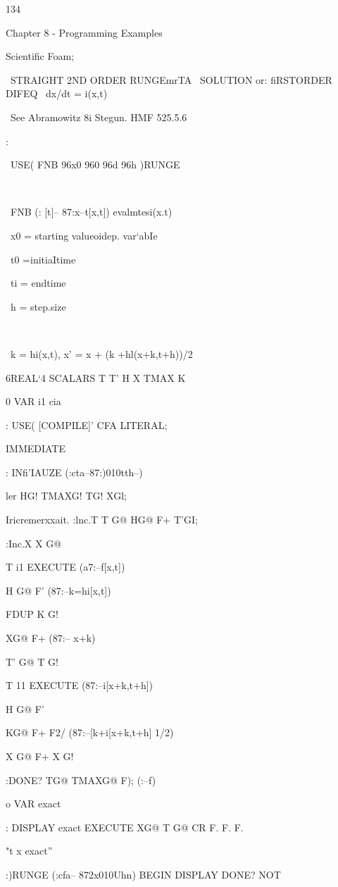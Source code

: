 {134

Chapter 8 - Programming Examples

Scientific Foam;

 

\ STRAIGHT 2ND ORDER RUNGEmrTA
\ SOLUTION or: fiRSTORDER DIFEQ
\ dx/dt = i(x,t)

\ See Abramowitz 8i Stegun. HMF 525.5.6

\Usege:

\ USE( FNB 96x0 960 96d 96h )RUNGE

\

\ FNB (: [t]-- 87:x--t[x,t]) evalmtesi(x.t)

\ x0 = starting valueoidep. var‘abIe

\ t0 =initiaItime

\ ti = endtime

\ h = step.size

\

\ k = hi(x,t), x' = x + (k +hl(x+k,t+h))/2

6REAL‘4 SCALARS T T' H X TMAX K

0 VAR i1 \tohoid cia

: USE( [COMPILE]' CFA LITERAL;

IMMEDIATE

: INfi'IAUZE (:cta--87:)010tth--)

ler HG! TMAXG! TG! XGl;

 

 

\Theeeworda Iricremerxxait.
:lnc.T T G@ HG@ F+ T'GI;

:Inc.X X G@

T i1 EXECUTE (a7:--f[x,t])

H G@ F' (87:--k=hi[x,t])

FDUP K G! \savek

XG@ F+ (87:-- x+k)

T' G@ T G!

T 11 EXECUTE (87:--i[x+k,t+h])

H G@ F'

KG@ F+ F2/
(87:--[k+i[x+k,t+h] 1/2)

X G@ F+ X G!

:DONE? TG@ TMAXG@ F); (:--f)

 

o VAR exact \cia

: DISPLAY exact EXECUTE
XG@ T G@ CR F. F. F.

\emit "t x exact”

:)RUNGE (:cfa-- 872x010Uhn)
BEGIN DISPLAY
DONE? NOT

}
